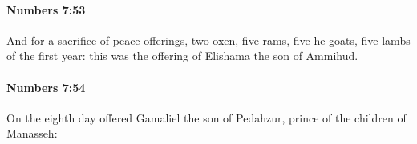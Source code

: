 		\paragraph{Numbers 7:53} %
			\label{NUMBERS-7-53}

			And for a sacrifice of peace offerings, two oxen, five rams, five he goats, five lambs of the first year: this was the offering of Elishama the son of Ammihud.


		\paragraph{Numbers 7:54} %
			\label{NUMBERS-7-54}

			On the eighth day offered Gamaliel the son of Pedahzur, prince of the children of Manasseh:


